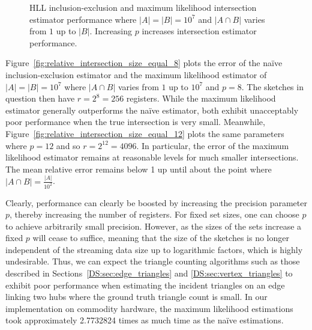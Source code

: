 \documentclass[10]{article}
\newcommand{\algoname}[1]{\textnormal{\textsc{#1}}}
\begin{document}
\begin{figure}
\begin{center}
		\caption{\algoname{HLL} inclusion-exclusion and maximum likelihood intersection estimator performance where $|A| = |B| = 10^7$ and $|A \cap B|$ varies from $1$ up to $|B|$.
			Increasing $p$ increases intersection estimator performance.
			\label{fig:relative_intersection_size_equal}}
	\end{center}
\end{figure}


Figure~\ref{fig:relative_intersection_size_equal_8} plots the error of the na\"ive inclusion-exclusion estimator and the maximum likelihood estimator of $|A| = |B| = 10^7$ where $|A \cap B|$ varies from $1$ up to $10^7$ and $p=8$.
The sketches in question then have $r = 2^8 = 256$ registers.
While the maximum likelihood estimator generally outperforms the na\"ive estimator, both exhibit unacceptably poor performance when the true intersection is very small. 
Meanwhile, Figure~\ref{fig:relative_intersection_size_equal_12} plots the same parameters where $p=12$ and so $r = 2^{12} = 4096$.
In particular, the error of the maximum likelihood estimator remains at reasonable levels for much smaller intersections.
The mean relative error remains below 1 up until about the point where $|A \cap B| = \frac{|A|}{10^2}$.

Clearly, performance can clearly be boosted by increasing the precision parameter $p$, thereby increasing the number of registers. 
For fixed set sizes, one can choose $p$ to achieve arbitrarily small precision. 
However, as the sizes of the sets increase a fixed $p$ will cease to suffice, meaning that the size of the sketches is no longer independent of the streaming data size up to logarithmic factors, which is highly undesirable.
Thus, we can expect the triangle counting algorithms such as those described in Sections~\ref{DS:sec:edge_triangles} and \ref{DS:sec:vertex_triangles} to exhibit poor performance when estimating the incident triangles on an edge linking two hubs where the ground truth triangle count is small.
In our implementation on commodity hardware, the maximum likelihood estimations took approximately 2.7732824 times as much time as the na\"ive estimations.
\end{document}

